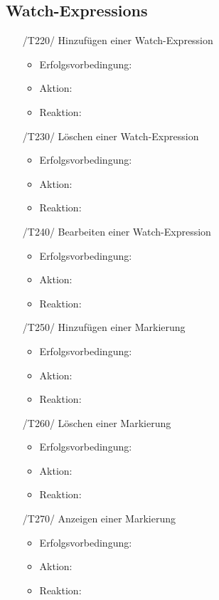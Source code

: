 \documentclass[parskip=full]{scrartcl}
\begin{document}
\subsection{Watch-Expressions}

\begin{itemize}

	\item[/T220/] Hinzufügen einer Watch-Expression
		\begin{itemize}
		\item Erfolgsvorbedingung:
		\item Aktion:
		\item Reaktion:		
		\end{itemize}	
	
	\item[/T230/] Löschen einer \gls{Watch-Expression}
		\begin{itemize}
		\item Erfolgsvorbedingung:
		\item Aktion:
		\item Reaktion:		
		\end{itemize}	
	
	\item[/T240/] Bearbeiten einer Watch-Expression
		\begin{itemize}
		\item Erfolgsvorbedingung:
		\item Aktion:
		\item Reaktion:		
		\end{itemize}	
	
	\item[/T250/] Hinzufügen einer Markierung
		\begin{itemize}
		\item Erfolgsvorbedingung:
		\item Aktion:
		\item Reaktion:		
		\end{itemize}	
	
	\item[/T260/] Löschen einer Markierung
		\begin{itemize}
		\item Erfolgsvorbedingung:
		\item Aktion:
		\item Reaktion:		
		\end{itemize}	
	
	\item[/T270/] Anzeigen einer Markierung
		\begin{itemize}
		\item Erfolgsvorbedingung:
		\item Aktion:
		\item Reaktion:		
		\end{itemize}	
	
		
\end{itemize}
\end{document}
